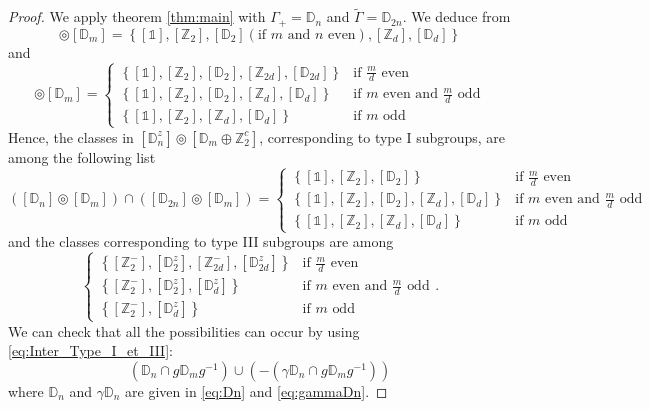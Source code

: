\documentclass[11pt,a4paper]{amsart}
\theoremstyle{definition}
\newcommand{\ZZ}{\mathbb{Z}}                %
\newcommand{\DD}{\mathbb{D}}                %
\newcommand{\1}{\mathds{1}}		            %
\newcommand{\set}[1]{\left\{#1\right\}}     %
\begin{document}
\begin{proof}
	We apply theorem \ref{thm:main} with $\Gamma_+=\DD_n$ and $\tilde{\Gamma}=\DD_{2n}$. We deduce from \cite[table 1]{Olive2019}
	\begin{equation*}
	[\DD_n]\circledcirc [\DD_m]=\set{[\1],[\ZZ_2],[\DD_2] (\text{if $m$ and $n$ even}),[\ZZ_{d}],[\DD_d]} 
	\end{equation*}
	and
	\begin{equation*}
	[\DD_{2n}]\circledcirc [\DD_m]=\begin{cases}
	\set{[\1],[\ZZ_2],[\DD_2],[\ZZ_{2d}],[\DD_{2d}]} &\text{if $\frac{m}{d}$ even}\\
	\set{[\1],[\ZZ_2],[\DD_2],[\ZZ_{d}],[\DD_{d}]}  & \text{if $m$ even and $\frac{m}{d}$ odd}\\
	\set{[\1],[\ZZ_2],[\ZZ_{d}],[\DD_{d}]} & \text{if $m$ odd}
	\end{cases}
	\end{equation*}
	Hence, the classes in $[\DD_n^z]\circledcirc [\DD_m\oplus \ZZ_2^c]$, corresponding to type I subgroups, are among the following list 
	\begin{equation*}
	([\DD_n]\circledcirc [\DD_m])\cap ([\DD_{2n}]\circledcirc[\DD_m])=
	\begin{cases}
	\set{[\1],[\ZZ_{2}],[\DD_2]} & \text{if $\frac{m}{d}$ even}\\
	\set{[\1],[\ZZ_{2}],[\DD_2],[\ZZ_d],[\DD_d]} & \text{if $m$ even and $\frac{m}{d}$ odd}\\
	\set{[\1],[\ZZ_{2}],[\ZZ_d],[\DD_d]} & \text{if $m$ odd}
	\end{cases}
	\end{equation*}
	and the classes corresponding to type III subgroups are among
	\begin{equation*}
	\begin{cases}
	\set{[\ZZ_2^-],[\DD_{2}^z],[\ZZ_{2d}^-],[\DD_{2d}^z]} & \text{if $\frac{m}{d}$ even}\\
	\set{[\ZZ_2^-],[\DD_{2}^z],[\DD_d^z]} & \text{if $m$ even and $\frac{m}{d}$ odd}\\
	\set{[\ZZ_2^-],[\DD_d^z]} & \text{if $m$ odd}
	\end{cases}.
	\end{equation*}
	We can check that all the possibilities can occur by using \eqref{eq:Inter_Type_I_et_III}:
	\begin{equation*}
	(\DD_n\cap g \DD_m g^{-1})\cup (-(\gamma\DD_n\cap g \DD_m g^{-1}))
	\end{equation*}
where $\DD_n$ and $\gamma \DD_n$ are given in \eqref{eq:Dn} and \eqref{eq:gammaDn}.

\end{proof}
\end{document}
